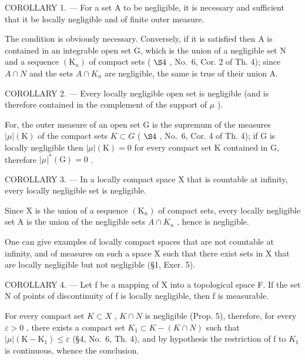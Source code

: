 COROLLARY 1. --- For a set A to be negligible, it is necessary and sufficient that it be locally negligible and of finite outer measure.

The condition is obviously necessary. Conversely, if it is satisfied then A is contained in an integrable open set G, which is the union of a negligible set N and a sequence \((\mathrm{K}_{n})\) of compact sets ( \(\S4\) , No.~6, Cor. 2 of Th. 4); since \(A \cap N\) and the sets \(A \cap K_{n}\) are negligible, the same is true of their union A.

COROLLARY 2. --- Every locally negligible open set is negligible (and is therefore contained in the complement of the support of \(\mu\) ).

For, the outer measure of an open set G is the supremum of the measures \(|\mu|(\mathrm{K})\) of the compact sets \(K \subset G\) ( \(\S4\) , No.~6, Cor. 4 of Th. 4); if G is locally negligible then \(|\mu|(\mathrm{K}) = 0\) for every compact set K contained in G, therefore \(|\mu|^{*}(\mathrm{G}) = 0\) .

COROLLARY 3. --- In a locally compact space X that is countable at infinity, every locally negligible set is negligible.

Since X is the union of a sequence \((\mathrm{K}_{n})\) of compact sets, every locally negligible set A is the union of the negligible sets \(A\cap K_{n}\) , hence is negligible.

One can give examples of locally compact spaces that are not countable at infinity, and of measures on such a space X such that there exist sets in X that are locally negligible but not negligible (§1, Exer. 5).

COROLLARY 4. --- Let f be a mapping of X into a topological space F. If the set N of points of discontinuity of f is locally negligible, then f is measurable.

For every compact set \(K \subset X\) , \(K \cap N\) is negligible (Prop. 5), therefore, for every \(\varepsilon > 0\) , there exists a compact set \(K_{1} \subset K - (K \cap N)\) such that \(|\mu|(\mathrm{K} - \mathrm{K}_{1}) \leqslant \varepsilon\) (§4, No.~6, Th. 4), and by hypothesis the restriction of f to \(K_{1}\) is continuous, whence the conclusion.

